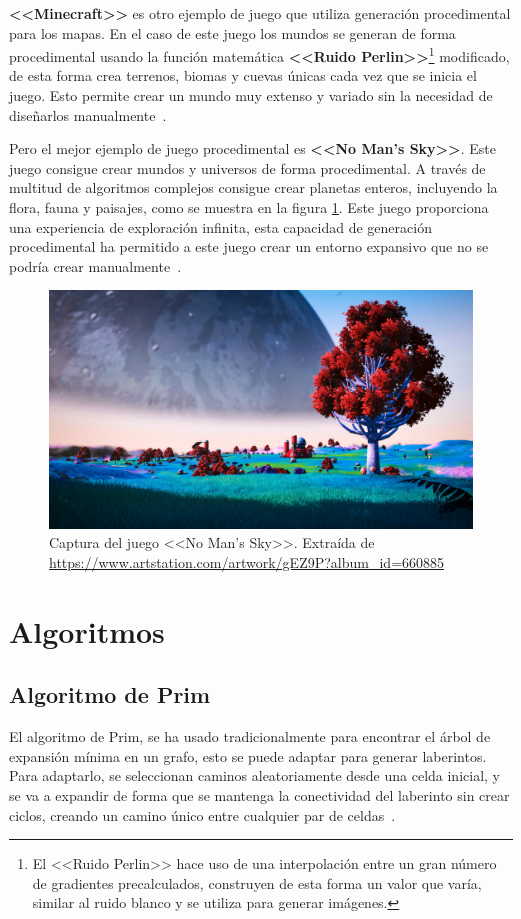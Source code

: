 \textbf{<<Minecraft>>} es otro ejemplo de juego que utiliza generación procedimental para los mapas. En el caso de este juego los mundos se generan de forma procedimental usando la función matemática \textbf{<<Ruido Perlin>>}\footnote{El <<Ruido Perlin>> hace uso de una interpolación entre un gran número de gradientes precalculados, construyen de esta forma un valor que varía, similar al ruido blanco y se utiliza para generar imágenes.\cite{wikipediaPerlin}} modificado, de esta forma crea terrenos, biomas y cuevas únicas cada vez que se inicia el juego. Esto permite crear un mundo muy extenso y variado sin la necesidad de diseñarlos manualmente~\cite{proceduralgenbooknoor}.

Pero el mejor ejemplo de juego procedimental es \textbf{<<No Man's Sky>>}. Este juego consigue crear mundos y universos de forma procedimental. A través de multitud de algoritmos complejos consigue crear planetas enteros, incluyendo la flora, fauna y paisajes, como se muestra en la figura \ref{fig:CaputraNoMansSky}. Este juego proporciona una experiencia de exploración infinita, esta capacidad de generación procedimental ha permitido a este juego crear un entorno expansivo que no se podría crear manualmente~\cite{proceduralgenbooknoor}.
\begin{figure}[h!]  
    \centering  
    \includegraphics[width=\textwidth]{img/NoMansSkyScreenShot.jpg}  
    \caption{Captura del juego <<No Man's Sky>>. Extraída de \url{https://www.artstation.com/artwork/gEZ9P?album_id=660885}}  
    \label{fig:CaputraNoMansSky}
\end{figure}

\section{Algoritmos}
\subsection{Algoritmo de Prim}
El algoritmo de Prim, se ha usado tradicionalmente para encontrar el árbol de expansión mínima en un grafo, esto se puede adaptar para generar laberintos. Para adaptarlo, se seleccionan caminos aleatoriamente desde una celda inicial, y se va a expandir de forma que se mantenga la conectividad del laberinto sin crear ciclos, creando un camino único entre cualquier par de celdas~\cite{MazeGenAnalysis}.

